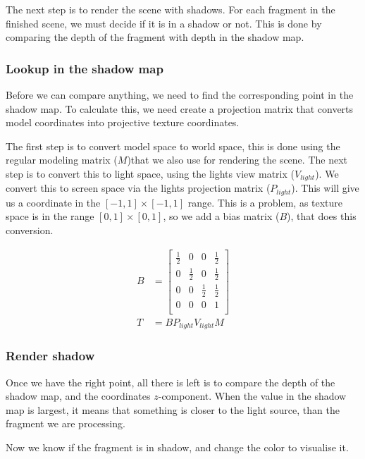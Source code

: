 The next step is to render the scene with shadows. For each fragment
in the finished scene, we must decide if it is in a shadow or
not. This is done by comparing the depth of the fragment with depth in
the shadow map.

\subsubsection*{Lookup in the shadow map}

Before we can compare anything, we need to find the corresponding
point in the shadow map. To calculate this, we need create a
projection matrix that converts model coordinates into projective
texture coordinates.

The first step is to convert model space to world space, this is done
using the regular modeling matrix ($M$)that we also use for rendering
the scene. The next step is to convert this to light space, using the
lights view matrix ($V_{light}$). We convert this to screen space via
the lights projection matrix ($P_{light}$). This will give us a
coordinate in the $[-1,1] \times [-1,1]$ range. This is a problem, as
texture space is in the range $[0,1] \times [0,1]$, so we add a bias
matrix ($B$), that does this conversion.

\begin{align*}
  B &= \begin{bmatrix}
    \frac{1}{2} & 0   & 0   & \frac{1}{2} \\
    0   & \frac{1}{2} & 0   & \frac{1}{2} \\
    0   & 0   & \frac{1}{2} & \frac{1}{2} \\
    0   & 0   & 0   & 1   \\
  \end{bmatrix} \\
  T &= BP_{light}V_{light}M
\end{align*}

\subsubsection*{Render shadow}

Once we have the right point, all there is left is to compare the
depth of the shadow map, and the coordinates $z$-component. When the
value in the shadow map is largest, it means that something is closer
to the light source, than the fragment we are processing.

Now we know if the fragment is in shadow, and change the color
to visualise it.

